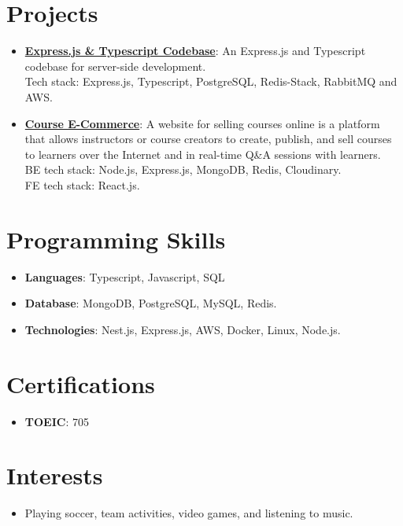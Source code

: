 \documentclass[letterpaper,12pt]{article}
\newcommand{\resumeItem}[2]{
  \item\small{
    \textbf{#1}{: #2 \vspace{-2pt}}
  }
}
\newcommand{\resumeSubItem}[2]{\resumeItem{#1}{#2}\vspace{-4pt}}
\newcommand{\resumeSubHeadingListStart}{\begin{itemize}[leftmargin=*]}
\newcommand{\resumeSubHeadingListEnd}{\end{itemize}}
\begin{document}
\section{Projects}
\resumeSubHeadingListStart
    \resumeSubItem{\href{https://github.com/pmhnam/express-ts-base}{Express.js & Typescript Codebase}}
    {
      An Express.js and Typescript codebase for server-side development.\\
      Tech stack: Express.js, Typescript, PostgreSQL, Redis-Stack, RabbitMQ and AWS.
    }
  \resumeSubItem{\href{https://api.ce.hnam.id.vn}{Course E-Commerce}}
    {A website for selling courses online is a platform that allows instructors or course creators to create, publish, and sell courses to learners over the Internet and in real-time Q\&A sessions with learners.\\
    BE tech stack: Node.js, Express.js, MongoDB, Redis, Cloudinary. \\
    FE tech stack: React.js.}
\resumeSubHeadingListEnd

\section{Programming Skills}
\resumeSubHeadingListStart
  \item{
    \textbf{Languages}{: Typescript, Javascript, SQL}
  }
  \item{
    \textbf{Database}{: MongoDB, PostgreSQL, MySQL, Redis. }
  }
  \item{
    \textbf{Technologies}{: Nest.js, Express.js, AWS, Docker, Linux, Node.js. }
  }
\resumeSubHeadingListEnd

\section{Certifications}
\resumeSubHeadingListStart
  \item{
    \textbf{TOEIC}{: 705}
  }
\resumeSubHeadingListEnd

\section{Interests}
\resumeSubHeadingListStart
  \item{
    Playing soccer, team activities, video games, and listening to music.
  }
\resumeSubHeadingListEnd

\end{document}
